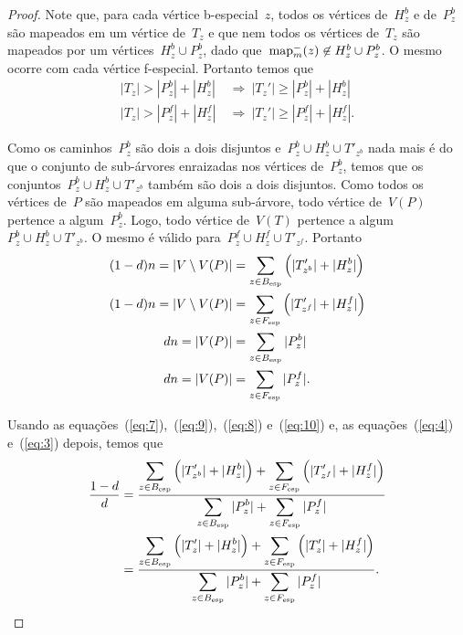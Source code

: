 \begin{proof}
	Note que, para cada vértice b-especial~$z$, todos os vértices 
	de~$H^b_z$ e de~$P^b_z$ são mapeados em um vértice 
	de~$T_z$ e que nem todos os vértices de~$T_z$ são mapeados por um
	vértices~$H^b_z\cup P_z^b$, 
	dado que~$\mathrm{map}^-_m(z)\not\in H^b_z\cup P_z^b$.
	O mesmo ocorre com cada vértice f-especial.
	Portanto temos que
	\begin{align}
		|T_z| > |P^b_z| + |H^b_z| 
		\ &\Rightarrow \
		|T_z'| \ge |P^b_z| + |H^b_z| \label{eq:5}\\
		|T_z| > |P^f_z| + |H^f_z|
		\ &\Rightarrow \
		|T_z'| \ge |P^f_z| + |H^f_z| \label{eq:6}.
	\end{align}

	Como os caminhos~$P^b_z$ são dois a dois disjuntos 
	e~$P^b_z\cup H^b_z\cup T'_{z^b}$
	nada mais é do que o conjunto de sub-árvores enraizadas
	nos vértices de~$P^b_z$, temos 
	que os conjuntos~${P^b_z\cup H^b_z\cup T'_{z^b}}$ também são 
	dois a dois disjuntos.
	Como todos os vértices de~$P$ são mapeados em alguma sub-árvore,
	todo vértice de~$V(P)$ pertence a algum~$P^b_z$.
	Logo,
	todo vértice de~$V(T)$ pertence a 
	algum~${P^b_z\cup H^b_z\cup T'_{z^b}}$.
	O mesmo é válido para~${P^f_z\cup H^f_z\cup T'_{z^f}}$.
	Portanto
	\begin{align}
		(1-d)n = |V\setminus V(P)| &= 
		\displaystyle\sum_{z\in B_{\mathrm{esp}}}\Big(|T_{z^b}'|+|H_z^b|\Big)
		\label{eq:7}\\
		(1-d)n = |V\setminus V(P)| &= 
		\displaystyle\sum_{z\in F_{\mathrm{esp}}}\Big(|T_{z^f}'|+|H_z^f|\Big)
		\label{eq:9}\\
		dn = |V(P)| &= 
		\displaystyle\sum_{z\in B_{\mathrm{esp}}}|P_z^b|
		\label{eq:8}\\
		dn = |V(P)| &= 
		\displaystyle\sum_{z\in F_{\mathrm{esp}}}|P_z^f| 
		\label{eq:10}.
	\end{align}

	Usando as equações~(\ref{eq:7}),~(\ref{eq:9}),~(\ref{eq:8}) e~(\ref{eq:10})
	e, as equações~(\ref{eq:4}) e~(\ref{eq:3}) depois, temos que
	\begin{align}
		\dfrac{1-d}{d} &= 
		\dfrac{
			\displaystyle\sum_{z\in B_{\mathrm{esp}}}
			\Big(|T'_{z^b}|+|H_z^b|\Big) + 
			\displaystyle\sum_{z\in F_{\mathrm{esp}}}
			\Big(|T'_{z^f}|+|H_z^f|\Big)}
			{\displaystyle\sum_{z\in B_{\mathrm{esp}}}|P_z^b| +
			\displaystyle\sum_{z\in F_{\mathrm{esp}}}|P_z^f|}
			\nonumber\\
		&= \dfrac{
			\displaystyle\sum_{z\in B_{\mathrm{esp}}}
			\Big(|T'_{z}|+|H_z^b|\Big) + 
			\displaystyle\sum_{z\in F_{\mathrm{esp}}}
			\Big(|T'_{z}|+|H_z^f|\Big)}
			{\displaystyle\sum_{z\in B_{\mathrm{esp}}}|P_z^b| +
			\displaystyle\sum_{z\in F_{\mathrm{esp}}}|P_z^f|}.
			\nonumber
	\end{align}
			

\end{proof}
